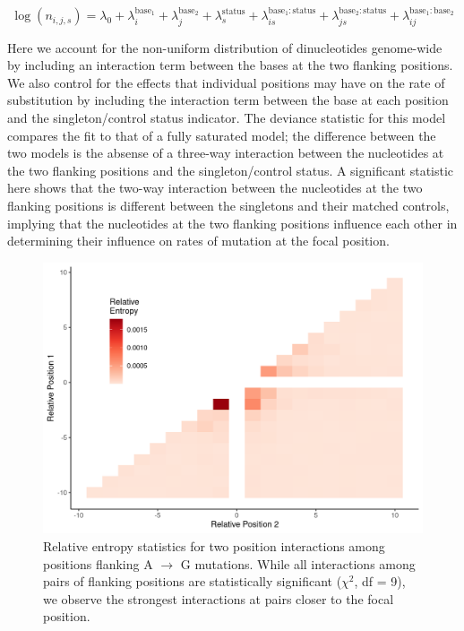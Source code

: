 \begin{equation}
    \log(n_{i,j,s}) = \lambda_0 + \lambda_i^{\textrm{base}_1} + \lambda_j^{\textrm{base}_2}  + \lambda_s^{\textrm{status}} + \lambda_{is}^{\textrm{base}_1:\textrm{status}} + \lambda_{js}^{\textrm{base}_2:\textrm{status}} + \lambda_{ij}^{\textrm{base}_1:\textrm{base}_2}
\end{equation}

Here we account for the non-uniform distribution of dinucleotides genome-wide by including an interaction term between the bases at the two flanking positions. We also control for the effects that individual positions may have on the rate of substitution by including the interaction term between the base at each position and the singleton/control status indicator. The deviance statistic for this model compares the fit to that of a fully saturated model; the difference between the two models is the absense of a three-way interaction between the nucleotides at the two flanking positions and the singleton/control status. A significant statistic here shows that the two-way interaction between the nucleotides at the two flanking positions is different between the singletons and their matched controls, implying that the nucleotides at the two flanking positions influence each other in determining their influence on rates of mutation at the focal position.

\begin{figure}
    \centering
    \includegraphics[scale=0.75]{chapters/figures/A_G_tp.png}
    \caption{Relative entropy statistics for two position interactions among positions flanking A $\rightarrow$ G mutations. While all interactions among pairs of flanking positions are statistically significant ($\chi^2$, df = 9), we observe the strongest interactions at pairs closer to the focal position.}
    \label{fig:two_pos}
\end{figure}

